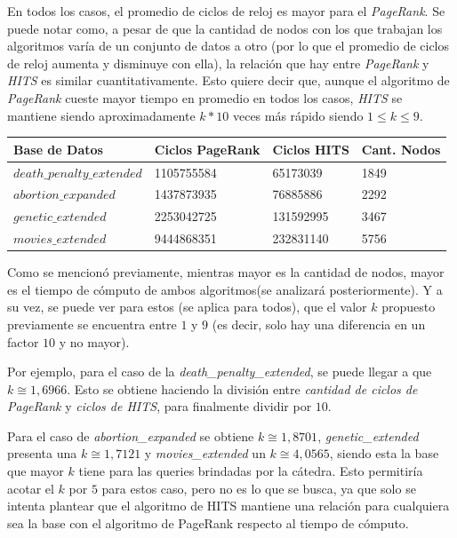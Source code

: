 	\par 

En todos los casos, el promedio de ciclos de reloj es  mayor para el \textit{PageRank}. Se puede notar como, a pesar de que la cantidad de nodos con los que trabajan los algoritmos varía de un conjunto de datos a otro (por lo que el promedio de ciclos de reloj aumenta y disminuye con ella), la relación que hay entre \textit{PageRank} y \textit{HITS} es similar cuantitativamente. Esto quiere decir que, aunque el algoritmo de \textit{PageRank} cueste mayor tiempo en promedio en todos los casos, \textit{HITS} se mantiene siendo aproximadamente $k*10$ veces más rápido siendo $1 \leq k \leq 9$. 
\par 

\begin{center}
    \begin{tabular}{| l | l | l | l |}
    \hline
    Base de Datos & Ciclos PageRank & Ciclos HITS & Cant. Nodos \\ \hline
    $death\_penalty\_extended$ & 1105755584 & 65173039 & 1849 \\ \hline
    $abortion\_expanded$ & 1437873935 & 76885886 & 2292 \\ \hline
	$genetic\_extended$ & 2253042725 & 131592995 & 3467 \\ \hline
	$movies\_extended$ & 9444868351 & 232831140	& 5756 \\ \hline
    \end{tabular}
\end{center}

Como se mencionó previamente, mientras mayor es la cantidad de nodos, mayor es el tiempo de cómputo de ambos algoritmos(se analizará posteriormente). Y a su vez, se puede ver para estos (se aplica para todos), que el valor $k$ propuesto previamente se encuentra entre $1$ y $9$ (es decir, solo hay una diferencia en un factor $10$ y no mayor).
\par 
Por ejemplo, para el caso de la \textit{death\_penalty\_extended}, se puede llegar a que $k \cong 1,6966$. Esto se obtiene haciendo la división entre \textit{cantidad de ciclos de PageRank} y \textit{ciclos de HITS}, para finalmente dividir por $10$. 
\par 
Para el caso de \textit{abortion\_expanded} se obtiene $k \cong 1,8701$, \textit{genetic\_extended} presenta una $ k \cong 1,7121$ y \textit{movies\_extended} un $k \cong 4,0565$, siendo esta la base que mayor $k$ tiene para las queries brindadas por la cátedra. Esto permitiría acotar el $k$ por $5$ para estos caso, pero no es lo que se busca, ya que solo se intenta plantear que el algoritmo de HITS mantiene una relación para cualquiera sea la base con el algoritmo de PageRank respecto al tiempo de cómputo.

